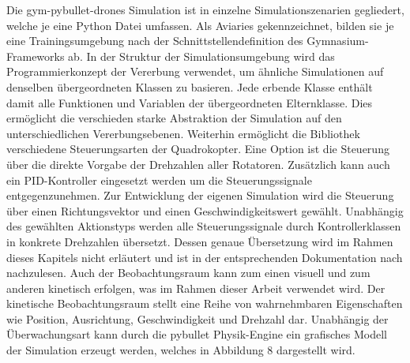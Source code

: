 Die gym-pybullet-drones Simulation ist in einzelne Simulationszenarien gegliedert, welche je eine Python Datei umfassen.
Als Aviaries gekennzeichnet, bilden sie je eine Trainingsumgebung nach der Schnittstellendefinition des Gymnasium-Frameworks ab.
In der Struktur der Simulationsumgebung wird das Programmierkonzept der Vererbung verwendet, um ähnliche Simulationen auf denselben übergeordneten Klassen zu basieren.
Jede erbende Klasse enthält damit alle Funktionen und Variablen der übergeordneten Elternklasse.
Dies ermöglicht die verschieden starke Abstraktion der Simulation auf den unterschiedlichen Vererbungsebenen.
Weiterhin ermöglicht die Bibliothek verschiedene Steuerungsarten der Quadrokopter. 
Eine Option ist die Steuerung über die direkte Vorgabe der Drehzahlen aller Rotatoren. 
Zusätzlich kann auch ein PID-Kontroller eingesetzt werden um die Steuerungssignale entgegenzunehmen.
Zur Entwicklung der eigenen Simulation wird die Steuerung über einen Richtungsvektor und einen Geschwindigkeitswert gewählt.
Unabhängig des gewählten Aktionstyps werden alle Steuerungssignale durch Kontrollerklassen in konkrete Drehzahlen übersetzt.
Dessen genaue Übersetzung wird im Rahmen dieses Kapitels nicht erläutert und ist in der entsprechenden Dokumentation nach \cite[]{Panerati.332021} nachzulesen.
Auch der Beobachtungsraum kann zum einen visuell und zum anderen kinetisch erfolgen, was im Rahmen dieser Arbeit verwendet wird.
Der kinetische Beobachtungsraum stellt eine Reihe von wahrnehmbaren Eigenschaften wie Position, Ausrichtung, Geschwindigkeit und Drehzahl dar.
Unabhängig der Überwachungsart kann durch die pybullet Physik-Engine ein grafisches Modell der Simulation erzeugt werden, welches in Abbildung 8 dargestellt wird.


